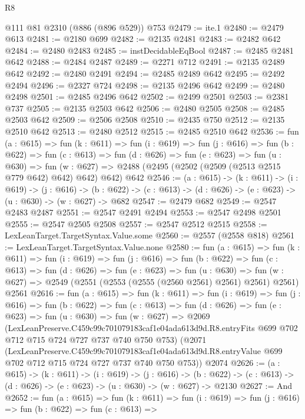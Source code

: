\begin{lexlean}{R8}
\begin{coremodule}
    @111
    @81
    @2310
    (@886 (@896 @529))
    @753
@2479 := ite.{1}
@2480 := @2479 @613
@2481 := @2180 @699
@2482 := @2135 @2481
@2483 := @2482 @642
@2484 := @2480 @2483
@2485 := instDecidableEqBool
@2487 := @2485 @2481 @642
@2488 := @2484 @2487
@2489 := @2271 @712
@2491 := @2135 @2489 @642
@2492 := @2480 @2491
@2494 := @2485 @2489 @642
@2495 := @2492 @2494
@2496 := @2327 @724
@2498 := @2135 @2496 @642
@2499 := @2480 @2498
@2501 := @2485 @2496 @642
@2502 := @2499 @2501
@2503 := @2381 @737
@2505 := @2135 @2503 @642
@2506 := @2480 @2505
@2508 := @2485 @2503 @642
@2509 := @2506 @2508
@2510 := @2435 @750
@2512 := @2135 @2510 @642
@2513 := @2480 @2512
@2515 := @2485 @2510 @642
@2536 := fun (a : @615) =>
  fun (k : @611) =>
  fun (i : @619) =>
  fun (j : @616) =>
  fun (b : @622) =>
  fun (c : @613) =>
  fun (d : @626) =>
  fun (e : @623) =>
  fun (u : @630) =>
  fun (w : @627) => @2488 (@2495 (@2502 (@2509 (@2513 @2515 @779 @642) @642) @642) @642) @642
@2546 := (a : @615) ->
  (k : @611) ->
  (i : @619) ->
  (j : @616) ->
  (b : @622) -> (c : @613) -> (d : @626) -> (e : @623) -> (u : @630) -> (w : @627) -> @682
@2547 := @2479 @682
@2549 := @2547 @2483 @2487
@2551 := @2547 @2491 @2494
@2553 := @2547 @2498 @2501
@2555 := @2547 @2505 @2508
@2557 := @2547 @2512 @2515
@2558 := LexLeanTarget.TargetSyntax.Value.some
@2560 := @2557 (@2558 @818)
@2561 := LexLeanTarget.TargetSyntax.Value.none
@2580 := fun (a : @615) =>
  fun (k : @611) =>
  fun (i : @619) =>
  fun (j : @616) =>
  fun (b : @622) =>
  fun (c : @613) =>
  fun (d : @626) =>
  fun (e : @623) =>
  fun (u : @630) =>
  fun (w : @627) => @2549 (@2551 (@2553 (@2555 (@2560 @2561) @2561) @2561) @2561) @2561
@2616 := fun (a : @615) =>
  fun (k : @611) =>
  fun (i : @619) =>
  fun (j : @616) =>
  fun (b : @622) =>
  fun (c : @613) =>
  fun (d : @626) =>
  fun (e : @623) =>
  fun (u : @630) =>
  fun (w : @627) =>
  @2069
    (LexLeanPreserve.C459c99c701079183caf1e04ada613d9d.R8.entryFits
      @699
      @702
      @712
      @715
      @724
      @727
      @737
      @740
      @750
      @753)
    (@2071
      (LexLeanPreserve.C459c99c701079183caf1e04ada613d9d.R8.entryValue
        @699
        @702
        @712
        @715
        @724
        @727
        @737
        @740
        @750
        @753))
    @2074
@2626 := (a : @615) ->
  (k : @611) ->
  (i : @619) ->
  (j : @616) ->
  (b : @622) -> (c : @613) -> (d : @626) -> (e : @623) -> (u : @630) -> (w : @627) -> @2130
@2627 := And
@2652 := fun (a : @615) =>
  fun (k : @611) =>
  fun (i : @619) =>
  fun (j : @616) =>
  fun (b : @622) =>
  fun (c : @613) =>

\end{coremodule}
\end{lexlean}
